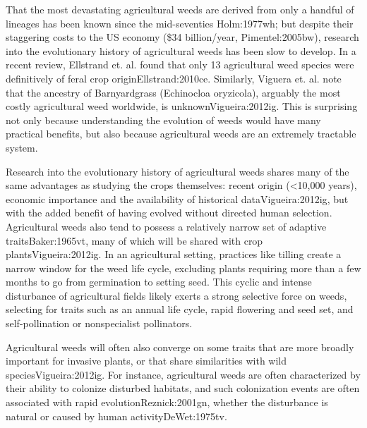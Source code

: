 \documentclass[twocolumn]{bmcart}%
\begin{document}
That the most devastating agricultural weeds are derived from only a handful of lineages has been known since the mid-seventies {Holm:1977wh}; but despite their staggering costs to the US economy (\$34 billion/year, {Pimentel:2005bw}), research into the evolutionary history of agricultural weeds has been slow to develop. In a recent review, Ellstrand et. al. found that only 13 agricultural weed species were definitively of feral crop origin{Ellstrand:2010ce}. Similarly, Viguera et. al. note that the ancestry of Barnyardgrass (Echinocloa oryzicola), arguably the most costly agricultural weed worldwide, is unknown{Vigueira:2012ig}. This is surprising not only because understanding the evolution of weeds would have many practical benefits, but also because agricultural weeds are an extremely tractable system. 

Research into the evolutionary history of agricultural weeds shares many of the same advantages as studying the crops themselves: recent origin (<10,000 years), economic importance and the availability of historical data{Vigueira:2012ig}, but with the added benefit of having evolved without directed human selection. Agricultural weeds also tend to possess a relatively narrow set of adaptive traits{Baker:1965vt}, many of which will be shared with crop plants{Vigueira:2012ig}. In an agricultural setting, practices like tilling create a narrow window for the weed life cycle, excluding plants requiring more than a few months to go from germination to setting seed. This cyclic and intense disturbance of agricultural fields likely exerts a strong selective force on weeds, selecting for traits such as an annual life cycle, rapid flowering and seed set, and self-pollination or nonspecialist pollinators.
%
%
%
%
%
%

Agricultural weeds will often also converge on some traits that are more broadly important for invasive plants, or that share similarities with wild species{Vigueira:2012ig}. For instance, agricultural weeds are often characterized by their ability to colonize disturbed habitats, and such colonization events are often associated with rapid evolution{Reznick:2001gn}, whether the disturbance is natural or caused by human activity{DeWet:1975tv}. 
\end{document}
